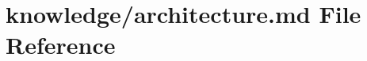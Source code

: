 \hypertarget{architecture_8md}{}\section{knowledge/architecture.md File Reference}
\label{architecture_8md}
